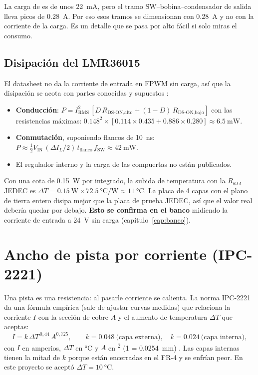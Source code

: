\begin{idea}
La carga de  es de unos \SI{22}{\milli\ampere}, pero el tramo SW--bobina--condensador de salida lleva picos
de \SI{0.28}{\ampere}. Por eso esos tramos se dimensionan con \SI{0.28}{\ampere} y no con la corriente de la carga.
Es un detalle que se pasa por alto fácil si solo miras el consumo.
\end{idea}

\subsection{Disipación del LMR36015}

El datasheet no da la corriente de entrada en FPWM sin carga, así que la disipación se acota con partes conocidas y
supuestos \estimado:
\begin{itemize}
  \item \textbf{Conducción}: $P = I_\text{RMS}^2\,[D\,R_\text{DS-ON,alto} + (1-D)\,R_\text{DS-ON,bajo}]$ con las
  resistencias máximas: $\num{0.148}^2 \times [\num{0.114}\times\num{0.435} + \num{0.886}\times\num{0.280}] \approx \SI{6.5}{\milli\watt}$.
  \item \textbf{Conmutación}, suponiendo flancos de \SI{10}{\nano\second}:
  $P \approx \tfrac12 V_\text{IN}\,(\Delta I_L/2)\,t_\text{flanco}\,f_\text{SW} \approx \SI{42}{\milli\watt}$.
  \item El regulador interno y la carga de las compuertas no están publicados.
\end{itemize}
Con una cota de \SI{0.15}{\watt} por integrado, la subida de temperatura con la $R_{\theta JA}$ JEDEC es
$\Delta T = \SI{0.15}{\watt}\times\SI{72.5}{\degreeCelsius\per\watt} \approx \SI{11}{\degreeCelsius}$. La placa de 4
capas con el plano de tierra entero disipa mejor que la placa de prueba JEDEC, así que el valor real debería quedar
por debajo. \textbf{Esto se confirma en el banco} midiendo la corriente de entrada a \SI{24}{\volt} sin carga
(capítulo~\ref{cap:banco}).

\section{Ancho de pista por corriente (IPC-2221)}\label{sec:c10-ancho}

Una pista es una resistencia: al pasarle corriente se calienta. La norma IPC-2221 da una fórmula empírica (sale de
ajustar curvas medidas) que relaciona la corriente $I$ con la sección de cobre $A$ y el aumento de temperatura
$\Delta T$ que aceptas:
\begin{equation}\label{eq:c10-ipc}
I = k\,\Delta T^{\,0,44}\,A^{0,725},\qquad k = \num{0.048}\ \text{(capa externa)},\quad k = \num{0.024}\ \text{(capa interna)},
\end{equation}
con $I$ en amperios, $\Delta T$ en \si{\degreeCelsius} y $A$ en \si{\mil\squared} (\SI{1}{\mil} = \SI{0.0254}{\milli\meter})
\copia. Las capas internas tienen la mitad de $k$ porque están encerradas en el FR-4 y se enfrían peor. En este
proyecto se aceptó $\Delta T = \SI{10}{\degreeCelsius}$.

